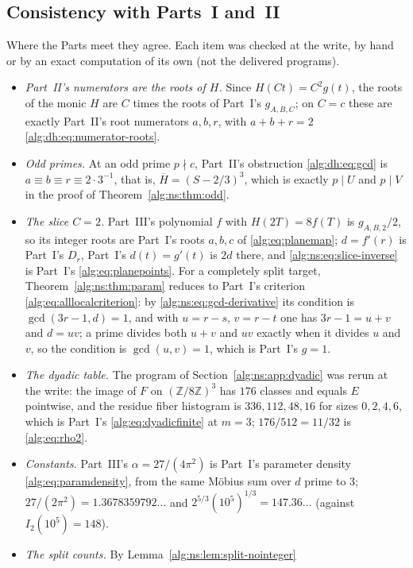 \documentclass[11pt]{article}
\numberwithin{equation}{section}
\theoremstyle{plain}
\theoremstyle{plain}
\theoremstyle{plain}
\theoremstyle{definition}
\theoremstyle{definition}
\theoremstyle{definition}
\theoremstyle{remark}
\newcommand{\Z}{\mathbb Z}\newcommand{\Q}{\mathbb Q}
\begin{document}
\subsection{Consistency with Parts~I and~II}\label{alg:ns:sec:consistency}
Where the Parts meet they agree. Each item was checked at the write, by
hand or by an exact computation of its own (not the delivered programs).
\begin{itemize}[itemsep=2pt,topsep=3pt]
\item \emph{Part~II's numerators are the roots of $H$.} Since
$H(Ct)=C^2g(t)$, the roots of the monic $H$ are $C$ times the roots of
Part~I's $g_{A,B,C}$; on $C=c$ these are exactly Part~II's root
numerators $a,b,r$, with $a+b+r=2$ \eqref{alg:dh:eq:numerator-roots}.
\item \emph{Odd primes.} At an odd prime $p\nmid c$, Part~II's obstruction
\eqref{alg:dh:eq:gcd} is $a\equiv b\equiv r\equiv2\cdot3^{-1}$, that is,
$\overline H=(S-2/3)^3$, which is exactly $p\mid U$ and $p\mid V$ in the
proof of Theorem~\ref{alg:ns:thm:odd}.
\item \emph{The slice $C=2$.} Part~III's polynomial $f$ with $H(2T)=8f(T)$
is $g_{A,B,2}/2$, so its integer roots are Part~I's roots $a,b,c$ of
\eqref{alg:eq:planemap}; $d=f'(r)$ is Part~I's $D_r$, Part~I's
$d(t)=g'(t)$ is $2d$ there, and \eqref{alg:ns:eq:slice-inverse} is
Part~I's \eqref{alg:eq:planepoints}. For a completely split target,
Theorem~\ref{alg:ns:thm:param} reduces to Part~I's criterion
\eqref{alg:eq:alllocalcriterion}: by \eqref{alg:ns:eq:gcd-derivative} its
condition is $\gcd(3r-1,d)=1$, and with $u=r-s$, $v=r-t$ one has
$3r-1=u+v$ and $d=uv$; a prime divides both $u+v$ and $uv$ exactly when
it divides $u$ and $v$, so the condition is $\gcd(u,v)=1$, which is
Part~I's $g=1$.
\item \emph{The dyadic table.} The program of
Section~\ref{alg:ns:app:dyadic} was rerun at the write: the image of $F$
on $(\Z/8\Z)^3$ has $176$ classes and equals $E$ pointwise, and the
residue fiber histogram is $336,112,48,16$ for sizes $0,2,4,6$, which is
Part~I's \eqref{alg:eq:dyadicfinite} at $m=3$;
$176/512=11/32$ is \eqref{alg:eq:rho2}.
\item \emph{Constants.} Part~III's $\alpha=27/(4\pi^2)$ is Part~I's
parameter density \eqref{alg:eq:paramdensity}, from the same M\"obius sum
over $d$ prime to $3$; $27/(2\pi^2)=1.3678359792\ldots$ and
$2^{5/3}(10^5)^{1/3}=147.36\ldots$ (against $I_2(10^5)=148$).
\item \emph{The split counts.} By Lemma~\ref{alg:ns:lem:split-nointeger}

\end{itemize}
\end{document}
